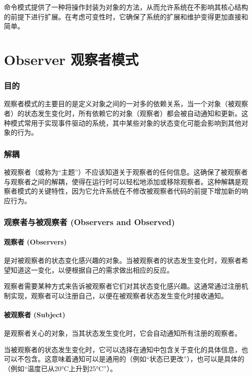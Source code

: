 命令模式提供了一种将操作封装为对象的方法，从而允许系统在不影响其核心结构的前提下进行扩展。在考虑可变性时，它确保了系统的扩展和维护变得更加直接和简单。

\section{Observer 观察者模式}

\subsubsection{目的}
观察者模式的主要目的是定义对象之间的一对多的依赖关系，当一个对象（被观察者）的状态发生变化时，所有依赖它的对象（观察者）都会被自动通知和更新。这种模式常用于实现事件驱动的系统，其中某些对象的状态变化可能会影响到其他对象的行为。

\subsubsection{解耦}
被观察者（或称为“主题”）不应该知道关于观察者的任何信息。这确保了被观察者与观察者之间的解耦，使得在运行时可以轻松地添加或移除观察者。这种解耦是观察者模式的关键特性，因为它允许系统在不修改被观察者代码的前提下增加新的响应行为。

\subsubsection{观察者与被观察者 (Observers and Observed)}

\paragraph{观察者 (Observers)}是对被观察者的状态变化感兴趣的对象。当被观察者的状态发生变化时，观察者希望知道这一变化，以便根据自己的需求做出相应的反应。

观察者需要某种方式来告诉被观察者它们对其状态变化感兴趣。这通常通过注册机制实现，观察者可以注册自己，以便在被观察者状态发生变化时接收通知。

\paragraph{被观察者 (Subject)}是观察者关心的对象，当其状态发生变化时，它会自动通知所有注册的观察者。

当被观察者的状态发生变化时，它可以选择在通知中包含关于变化的具体信息，也可以不包含。这意味着通知可以是通用的（例如“状态已更改”），也可以是具体的（例如“温度已从20°C上升到25°C”）。

